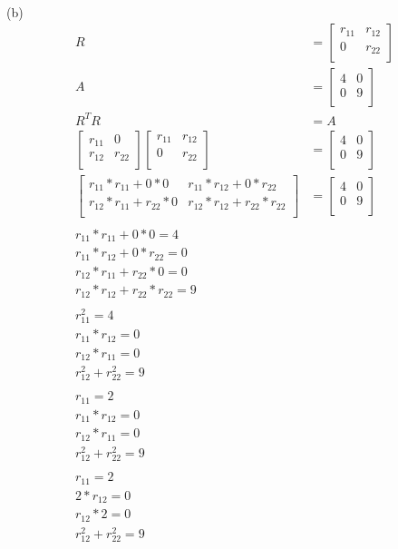 \documentclass{article}
\begin{document}
	\\
	(b)\\
	\begin{align*}
		R &= \begin{bmatrix}
			r_{11} & r_{12}\\
			0 & r_{22}\\
			\end{bmatrix}\\
		A &= \begin{bmatrix}
		4 & 0\\
		0 & 9\\
		\end{bmatrix}\\
		R^TR &= A\\
		\begin{bmatrix}
		r_{11} & 0\\
		r_{12} & r_{22}\\
		\end{bmatrix} \begin{bmatrix}
		r_{11} & r_{12}\\
		0 & r_{22}\\
		\end{bmatrix} &= \begin{bmatrix}
		4 & 0\\
		0 & 9\\
		\end{bmatrix}\\
		\begin{bmatrix}
		r_{11}*r_{11}+0*0 & r_{11}*r_{12} + 0*r_{22}\\
		r_{12}*r_{11}+r_{22}*0 & r_{12}*r_{12} + r_{22}*r_{22}\\
		\end{bmatrix} &= \begin{bmatrix}
		4 & 0\\
		0 & 9\\
		\end{bmatrix}\\
		\\
		r_{11}*r_{11}+0*0 = 4\\
		r_{11}*r_{12} + 0*r_{22} = 0\\
		r_{12}*r_{11}+r_{22}*0 = 0\\
		r_{12}*r_{12} + r_{22}*r_{22} = 9\\
		\\
		r_{11}^2 = 4\\
		r_{11}*r_{12} = 0\\
		r_{12}*r_{11} = 0\\
		r_{12}^2 + r_{22}^2 = 9\\
		\\
		r_{11} = 2\\
		r_{11}*r_{12} = 0\\
		r_{12}*r_{11} = 0\\
		r_{12}^2 + r_{22}^2 = 9\\
		\\
		r_{11} = 2\\
		2*r_{12} = 0\\
		r_{12}*2 = 0\\
		r_{12}^2 + r_{22}^2 = 9\\	
	\end{align*}
\end{document}
